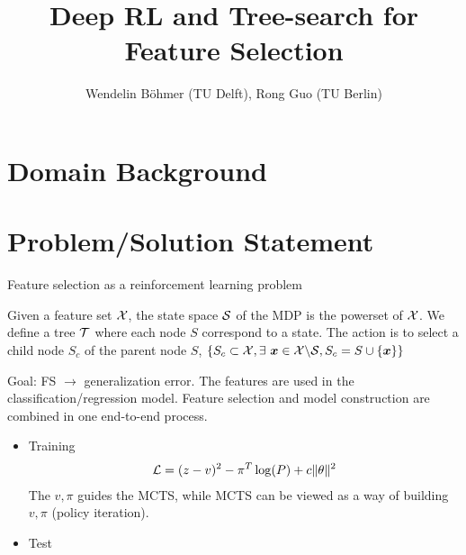 

\title{Deep RL and Tree-search for Feature Selection}
\author{Wendelin B\"ohmer (TU Delft), Rong Guo (TU Berlin)}



\maketitle

\listoftodos

\section{Domain Background}


\section{Problem/Solution Statement}


Feature selection as a reinforcement learning problem \citep{gaudel_feature_2010}

Given a feature set $\mathcal{X}$, the state space $\mathcal{S}$ of the MDP is the powerset of $\mathcal{X}$. We define a tree $\mathcal{T}$ where each node $S$ correspond to a state. The action is to select a child node $S_c$ of the parent node $S$, $\{S_c \subset \mathcal{X}, \exists ~ \bm x  \in \mathcal{X} \backslash \mathcal{S}, S_c = S \cup \{\bm x\} \} $

Goal: FS $\rightarrow$ generalization error. The features are used in the classification/regression model. Feature selection and model construction are combined in one end-to-end process.
\begin{itemize}
	\item Training\\
	\begin{align}
	   \mathcal{L} = (z-v)^2 - \pi^T\log(P) + c\|\theta\|^2
	\end{align}
	The $v, \pi$ guides the MCTS, while MCTS can be viewed as a way of building $v, \pi$ (policy iteration). 
	
	\item Test
\end{itemize}

